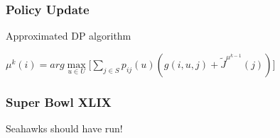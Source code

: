 \documentclass{beamer}
\begin{document}
\begin{frame}
\frametitle{Policy Update}
\begin{block}{Approximated DP algorithm}
\begin{center}
$\mu^{k}(i) = arg\max\limits_{u \in U} \Big[ \sum\limits_{j \in S} p_{ij}(u)(g(i,u,j) +  \widetilde{J}^{\mu^{k-1}}(j))\Big]$
\end{center}
\end{block}
\end{frame}

\begin{frame}
\frametitle{Super Bowl XLIX}
\begin{center}
Seahawks should have run!
\end{center}
\end{frame}
\end{document}
